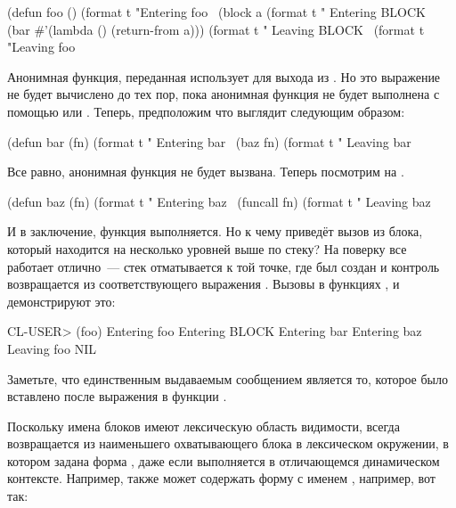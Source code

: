 \begin{myverb}
(defun foo ()
  (format t "Entering foo~%
  (block a
    (format t " Entering BLOCK~%
    (bar #'(lambda () (return-from a)))
    (format t " Leaving BLOCK~%
  (format t "Leaving foo~%
\end{myverb}

Анонимная функция, переданная  использует  для выхода из
. Но это выражение  не будет вычислено до тех пор, пока
анонимная функция не будет выполнена с помощью  или . Теперь,
предположим что  выглядит следующим образом:

\begin{myverb}
(defun bar (fn)
  (format t "  Entering bar~%
  (baz fn)
  (format t "  Leaving bar~%
\end{myverb}

Все равно, анонимная функция не будет вызвана. Теперь посмотрим на .

\begin{myverb}
(defun baz (fn)
  (format t "   Entering baz~%
  (funcall fn)
  (format t "   Leaving baz~%
\end{myverb}

И в заключение, функция выполняется. Но к чему приведёт вызов  из блока,
который находится на несколько уровней выше по стеку? На поверку все работает отлично~---
стек отматывается к той точке, где  был создан и контроль возвращается из
соответствующего выражения . Вызовы  в функциях ,
 и  демонстрируют это:

\begin{myverb}
  CL-USER> (foo)
  Entering foo
   Entering BLOCK
    Entering bar
     Entering baz
  Leaving foo
  NIL
\end{myverb}

Заметьте, что единственным выдаваемым сообщением  является то, которое
было вставлено после выражения  в функции .

Поскольку имена блоков имеют лексическую область видимости,  всегда
возвращается из наименьшего охватывающего блока  в лексическом окружении, в
котором задана форма , даже если  выполняется в
отличающемся динамическом контексте. Например,  также может содержать форму
 с именем , например, вот так:

